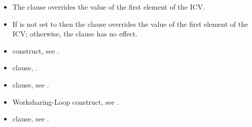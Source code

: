\linenumbers

\descr
\begin{itemize}
\item The  clause overrides the value of the first element of the
 ICV.

\item If  is not set to  then the  clause overrides the value of the
first element of the  ICV; otherwise, the  clause has no effect.
\end{itemize}

\crossreferences
\begin{itemize}
\item {} construct, see
.

\item {} clause,
.

\item {} clause, see
.

\item Worksharing-Loop construct, see
.

\item {} clause, see
.
\end{itemize}






